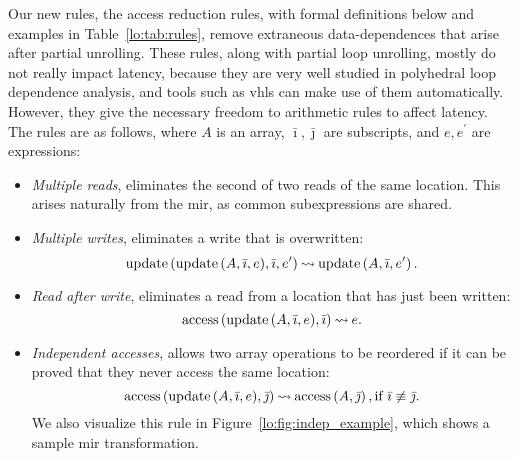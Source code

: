 Our new rules, the access reduction rules, with formal definitions below and
examples in Table~\ref{lo:tab:rules}, remove extraneous data-dependences that
arise after partial unrolling.  These rules, along with partial loop unrolling,
mostly do not really impact latency, because they are very well studied in
polyhedral loop dependence analysis, and tools such as \gls{vhls} can make use
of them automatically.  However, they give the necessary freedom to arithmetic
rules to affect latency.  The rules are as follows, where $A$ is an array,
$\bar{\imath}, \bar{\jmath}$ are subscripts, and $e, e^\prime$ are expressions:
\begin{itemize}

    \item \emph{Multiple reads}, eliminates the second of two reads of the
    same location.  This arises naturally from the \gls{mir}, as common
    subexpressions are shared.

    \item \emph{Multiple writes}, eliminates a write that is overwritten:
    \vspace{-11pt}
    \begin{equation}
        \operatorname{\mathrm{update}}\left({\operatorname{\mathrm{update}}\left({A}, {\bar{\imath}}, {e}\right)}, {\bar{\imath}}, {e^\prime}\right)
            \mathbin{\rightsquigarrow} \operatorname{\mathrm{update}}\left({A}, {\bar{\imath}}, {e^\prime}\right).
    \end{equation}

    \item \emph{Read after write}, eliminates a read from a location
    that has just been written:
    \vspace{-11pt}
    \begin{equation}
        \operatorname{\mathrm{access}}\left({\operatorname{\mathrm{update}}\left({A}, {\bar{\imath}}, {e}\right)}, {\bar{\imath}}\right) \mathbin{\rightsquigarrow} e.
    \end{equation}

    \item \emph{Independent accesses}, allows two array operations to be
    reordered if it can be proved that they never access the same location:
    \vspace{-11pt}
    \begin{equation}
        \operatorname{\mathrm{access}}\left({\operatorname{\mathrm{update}}\left({A}, {\bar{\imath}}, {e}\right)}, {\bar{\jmath}}\right)
            \mathbin{\rightsquigarrow} \operatorname{\mathrm{access}}\left({A}, {\bar{\jmath}}\right),
        \text{if~} \bar{\imath} \not\equiv \bar{\jmath}.
    \end{equation}
    We also visualize this rule in Figure~\ref{lo:fig:indep_example}, which
    shows a sample \gls{mir} transformation.
\end{itemize}

